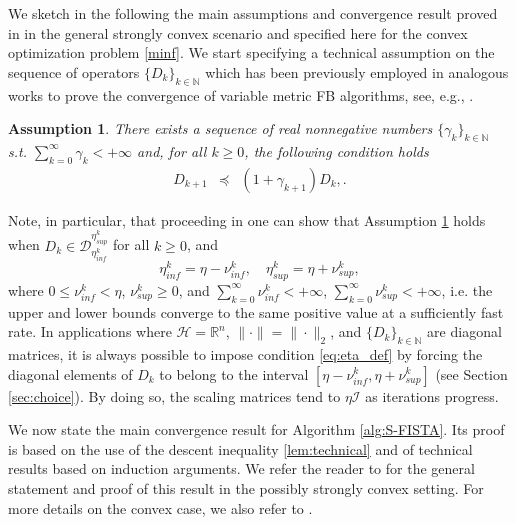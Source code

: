 \documentclass[conference]{IEEEtran}
\newtheorem{assumption}{Assumption}
\begin{document}
We sketch in the following the main assumptions and convergence result proved in \cite[Section 3.1]{SAGE-FISTA} in the general strongly convex scenario and specified here for the convex optimization problem \eqref{minf}. We start specifying a technical assumption on the sequence of operators $\{D_k\}_{k\in\mathbb{N}}$ which has been previously employed in analogous works to prove the convergence of variable metric FB algorithms, see, e.g., \cite{Combettes-Vu-2014,Bonettini-Loris-Porta-Prato-2015,Bonettini-Porta-Ruggiero-2016,Bonettini2018a}.

\medskip

\begin{assumption}\label{ass:1}
There exists a sequence of real nonnegative numbers $\{\gamma_k\}_{k\in\mathbb{N}}$ s.t. $\sum_{k=0}^\infty\gamma_k<+\infty$ and, for all $k\geq 0$, the following condition holds  
\begin{eqnarray} \label{eq:assumption}
D_{k+1}&\preceq&(1+\gamma_{k+1})D_k,\label{eq:Dk_cond}.
\end{eqnarray}
\end{assumption}

Note, in particular, that proceeding in \cite[Remark 3.3]{SAGE-FISTA} one can show that Assumption \ref{ass:1} holds when $D_k\in\mathcal{D}_{\eta_{inf}^k}^{\eta_{sup}^k}$ for all $k\geq 0$, and
\begin{equation}\label{eq:eta_def}
\eta_{inf}^k=\eta-\nu_{inf}^k, \quad \eta_{sup}^k=\eta+\nu_{sup}^k,
\end{equation}
where $0\leq\nu_{inf}^k< \eta$, $\nu_{sup}^k\geq 0$, and $\sum_{k=0}^{\infty}\nu_{inf}^k<+\infty$, $\sum_{k=0}^{\infty}\nu_{sup}^k<+\infty$, i.e. the upper and lower bounds converge to the same positive value at a sufficiently fast rate. 
In applications where $\mathcal{H}=\mathbb{R}^n$, $\|\cdot\|=\|\cdot\|_2$, and $\{D_k\}_{k\in\mathbb{N}}$ are diagonal matrices, it is always possible to impose condition \eqref{eq:eta_def} by forcing the diagonal elements of $D_k$ to belong to the interval $[\eta-\nu_{inf}^k,\eta+\nu_{sup}^k]$ (see Section \ref{sec:choice}). By doing so, the scaling matrices tend to $\eta\mathcal{I}$ as iterations progress.


\medskip

We now state the main convergence result for Algorithm \ref{alg:S-FISTA}. Its proof is based on the use of the descent inequality \ref{lem:technical} and of technical results based on induction arguments. We refer the reader to \cite[Theorem 3.1]{SAGE-FISTA} for the general statement and proof of this result in the possibly strongly convex setting. For more details on the convex case, we also refer to \cite[Corollary 3.3]{SAGE-FISTA}.
\end{document}
